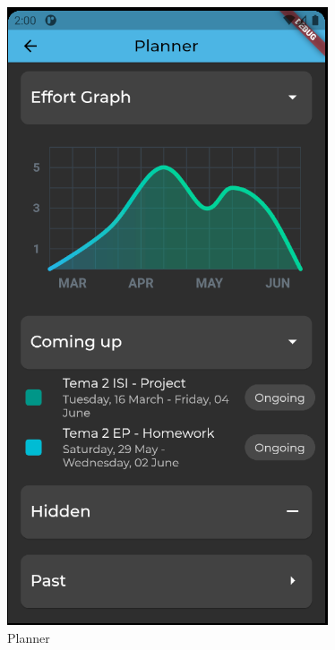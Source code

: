 \begin{figure}[!ht]
\begin{minipage}[b]{0.32\textwidth}
        \captionsetup{justification=centering}
        \includegraphics[width=\textwidth]{figures/ss/image3.png}
        \caption{Planner}
        \label{5:fig:fplanner}
    \end{minipage}
     \hfill
    \begin{minipage}[b]{0.32\textwidth}
        \captionsetup{justification=centering}

\end{minipage}
\end{figure}
